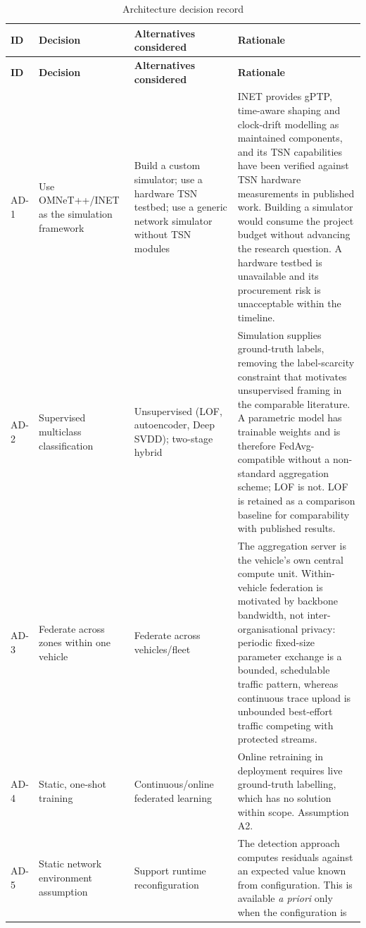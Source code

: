 \begin{longtable}{p{} p{} p{} p{}}
\caption{Architecture decision record}\\
\toprule
\textbf{ID} & \textbf{Decision} & \textbf{Alternatives considered} & \textbf{Rationale} \\
\midrule
\endfirsthead
\toprule
\textbf{ID} & \textbf{Decision} & \textbf{Alternatives considered} & \textbf{Rationale} \\
\midrule
\endhead
AD-1 & Use OMNeT++/INET as the simulation framework &
Build a custom simulator; use a hardware TSN testbed; use a generic network simulator
without TSN modules &
INET provides gPTP, time-aware shaping and clock-drift modelling as maintained
components, and its TSN capabilities have been verified against TSN hardware
measurements in published work. Building a simulator would consume the project budget
without advancing the research question. A hardware testbed is unavailable and its
procurement risk is unacceptable within the timeline. \\
\addlinespace
AD-2 & Supervised multiclass classification &
Unsupervised (LOF, autoencoder, Deep SVDD); two-stage hybrid &
Simulation supplies ground-truth labels, removing the label-scarcity constraint that
motivates unsupervised framing in the comparable literature. A parametric model has
trainable weights and is therefore FedAvg-compatible without a non-standard
aggregation scheme; LOF is not. LOF is retained as a comparison baseline for
comparability with published results. \\
\addlinespace
AD-3 & Federate across zones within one vehicle &
Federate across vehicles/fleet &
The aggregation server is the vehicle's own central compute unit. Within-vehicle
federation is motivated by backbone bandwidth, not inter-organisational privacy:
periodic fixed-size parameter exchange is a bounded, schedulable traffic pattern,
whereas continuous trace upload is unbounded best-effort traffic competing with
protected streams. \\
\addlinespace
AD-4 & Static, one-shot training &
Continuous/online federated learning &
Online retraining in deployment requires live ground-truth labelling, which has no
solution within scope. Assumption A2. \\
\addlinespace
AD-5 & Static network environment assumption &
Support runtime reconfiguration &
The detection approach computes residuals against an expected value known from
configuration. This is available \emph{a priori} only when the configuration is

\end{longtable}
